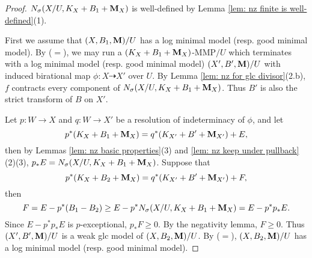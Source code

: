 \documentclass[11pt]{amsart}
\numberwithin{equation}{section}
\newcommand{\Mm}{{\bf{M}}}
\theoremstyle{definition}
\theoremstyle{definition}
\theoremstyle{definition}
\begin{document}
\begin{proof}
$N_{\sigma}(X/U,K_X+B_1+\Mm_X)$ is well-defined by Lemma \ref{lem: nz finite is well-defined}(1). 

First we assume that $(X,B_1,\Mm)/U$ has a log minimal model (resp. good minimal model). By \cite[Theorem 2.8]{HL21} ($=$\cite[Version 3, Theorem 2.24]{HL21}), we may run a $(K_X+B_1+\Mm_X)$-MMP$/U$ which terminates with a log minimal model (resp. good minimal model) $(X',B',\Mm)/U$ with induced birational map $\phi: X\dashrightarrow X'$ over $U$. By Lemma \ref{lem: nz for glc divisor}(2.b), $f$ contracts every component of $N_{\sigma}(X/U,K_X+B_1+\Mm_X)$. Thus $B'$ is also the strict transform of $B$ on $X'$.

Let $p: W\rightarrow X$ and $q: W\rightarrow X'$ be a resolution of indeterminacy of $\phi$, and let
$$p^*(K_X+B_1+\Mm_X)=q^*(K_{X'}+B'+\Mm_{X'})+E,$$
then by Lemmas \ref{lem: nz basic properties}(3) and \ref{lem: nz keep under pullback}(2)(3), $p_*E=N_{\sigma}(X/U,K_X+B_1+\Mm_X)$. Suppose that
$$p^*(K_X+B_2+\Mm_X)=q^*(K_{X'}+B'+\Mm_{X'})+F,$$
then $$F=E-p^*(B_1-B_2)\geq E-p^*N_{\sigma}(X/U,K_X+B_1+\Mm_X)=E-p^*p_*E.$$
Since $E-p^*p_*E$ is $p$-exceptional, $p_*F\geq 0$. By the negativity lemma, $F\geq 0$. Thus $(X',B',\Mm)/U$ is a weak glc model of $(X,B_2,\Mm)/U$. By \cite[Lemmas 3.5(2), 3.8]{HL21} ($=$\cite[Version 3, Lemmas 3.9(2), 3.15]{HL21}), $(X,B_2,\Mm)/U$ has a log minimal model (resp. good minimal model).


\end{proof}
\end{document}
